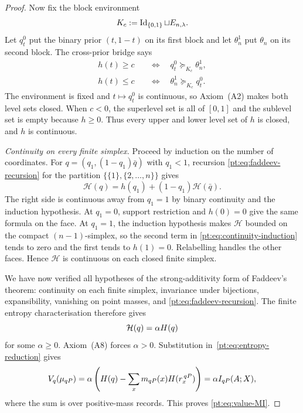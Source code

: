 \begin{proof}
Now fix the block environment
\[
 K_c:=\operatorname{Id}_{\{0,1\}}\sqcup E_{n,\lambda}.
\]
Let $q_t^0$ put the binary prior $(t,1-t)$ on its first block and let
$\theta_n^1$ put $\theta_n$ on its second block.  The cross-prior bridge says
\begin{align*}
 h(t)\ge c&\quad\Longleftrightarrow\quad q_t^0\succeq_{K_c}\theta_n^1,\\
 h(t)\le c&\quad\Longleftrightarrow\quad \theta_n^1\succeq_{K_c}q_t^0.
\end{align*}
The environment is fixed and $t\mapsto q_t^0$ is continuous, so
Axiom~\textup{(A2)} makes both level sets closed.  When $c<0$, the superlevel
set is all of $[0,1]$ and the sublevel set is empty because $h\ge0$.
Thus every upper and lower level set of $h$ is closed, and $h$ is continuous.

\emph{Continuity on every finite simplex.}
Proceed by induction on the number of coordinates.  For
$q=(q_1,(1-q_1)\bar q)$ with $q_1<1$, recursion
\eqref{pt:eq:faddeev-recursion} for the partition
$\{\{1\},\{2,\ldots,n\}\}$ gives
\begin{equation}
 \mathcal H(q)=h(q_1)+(1-q_1)\mathcal H(\bar q).
\label{pt:eq:continuity-induction}
\end{equation}
The right side is continuous away from $q_1=1$ by binary continuity and the
induction hypothesis.  At $q_1=0$, support restriction and $h(0)=0$ give
the same formula on the face.  At $q_1=1$, the induction hypothesis makes
$\mathcal H$ bounded on the compact $(n-1)$-simplex, so the second term in
\eqref{pt:eq:continuity-induction} tends to zero and the first tends to
$h(1)=0$.  Relabelling handles the other faces.  Hence $\mathcal H$ is
continuous on each closed finite simplex.

We have now verified all hypotheses of the strong-additivity form of
Faddeev's theorem: continuity on each finite simplex, invariance under
bijections, expansibility, vanishing on point masses, and
\eqref{pt:eq:faddeev-recursion}.  The finite entropy characterisation
\cite[Theorem~6]{BaezFritzLeinster2011} therefore gives
\[
 \mathcal H(q)=\alpha H(q)
\]
for some $\alpha\ge0$.  Axiom~\textup{(A8)} forces $\alpha>0$.
Substitution in~\eqref{pt:eq:entropy-reduction} gives
\[
 V_q(\mu_{qP})
 =\alpha\left(H(q)-\sum_x m_{qP}(x)
                    H(r_x^{\,qP})\right)
 =\alpha I_{qP}(A;X),
\]
where the sum is over positive-mass records.  This proves
\eqref{pt:eq:value-MI}.
\end{proof}


